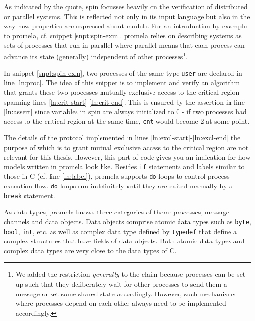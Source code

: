 As indicated by the quote, \gls{spin} focusses heavily on the verification of distributed or parallel systems.
This is reflected not only in its input language but also in the way how properties are expressed about models.
For an introduction by example to \gls{promela}, cf. snippet \ref{snpt:spin-exm}.
\gls{promela} relies on describing systems as sets of processes that run in parallel where parallel means that each process can advance its state (generally) independent of other processes\footnote{%
    We added the restriction \textit{generally} to the claim because processes can be set up such that they deliberately wait for other processes to send them a message or set some shared state accordingly.
    However, such mechanisms where processes depend on each other always need to be implemented accordingly.
}.

In snippet \ref{snpt:spin-exm}, two processes of the same type \lstinline{user} are declared in line \ref{ln:proc}.
The idea of this snippet is to implement and verify an algorithm that grants these two processes mutually exclusive access to the critical region spanning lines \ref{ln:crit-start}-\ref{ln:crit-end}.
This is ensured by the assertion in line \ref{ln:assert} since variables in \gls{spin} are always initialized to 0 - if two processes had access to the critical region at the same time, \lstinline{cnt} would become 2 at some point.

The details of the protocol implemented in lines \ref{ln:excl-start}-\ref{ln:excl-end} the purpose of which is to grant mutual exclusive access to the critical region are not relevant for this thesis.
However, this part of code gives you an indication for how models written in \gls{promela} look like.
Besides \lstinline{if} statements and labels similar to those in C (cf. line \ref{ln:label}), \gls{promela} supports \lstinline{do}-loops to control process execution flow.
\lstinline{do}-loops run indefinitely until they are exited manually by a \lstinline{break} statement.

As data types, \gls{promela} knows three categories of them: processes, message channels and data objects.
Data objects comprise atomic data types such as \lstinline{byte}, \lstinline{bool}, \lstinline{int}, etc. as well as complex data type defined by \lstinline{typedef} that define a complex structures that have fields of data objects.
Both atomic data types and complex data types are very close to the data types of C.

